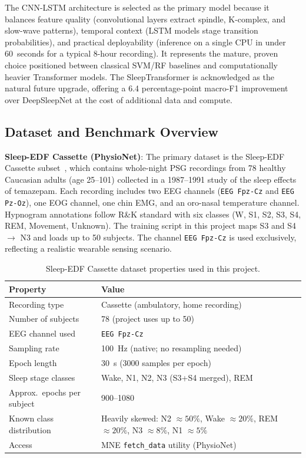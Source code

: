 \documentclass[10pt]{article}
\begin{document}
The CNN-LSTM architecture is selected as the primary model because it balances feature quality (convolutional layers extract spindle, K-complex, and slow-wave patterns), temporal context (LSTM models stage transition probabilities), and practical deployability (inference on a single CPU in under 60~seconds for a typical 8-hour recording). It represents the mature, proven choice positioned between classical SVM/RF baselines and computationally heavier Transformer models. The SleepTransformer is acknowledged as the natural future upgrade, offering a 6.4 percentage-point macro-F1 improvement over DeepSleepNet at the cost of additional data and compute.

\subsection{Dataset and Benchmark Overview}
\label{sec:datasets}

\textbf{Sleep-EDF Cassette (PhysioNet)}: The primary dataset is the Sleep-EDF Cassette subset~\cite{kemp2000analysis,goldberger2000physiobank}, which contains whole-night PSG recordings from 78 healthy Caucasian adults (age 25--101) collected in a 1987--1991 study of the sleep effects of temazepam. Each recording includes two EEG channels (\texttt{EEG Fpz-Cz} and \texttt{EEG Pz-Oz}), one EOG channel, one chin EMG, and an oro-nasal temperature channel. Hypnogram annotations follow R\&K standard with six classes (W, S1, S2, S3, S4, REM, Movement, Unknown). The training script in this project maps S3 and S4 $\rightarrow$ N3 and loads up to 50 subjects. The channel \texttt{EEG Fpz-Cz} is used exclusively, reflecting a realistic wearable sensing scenario.

\begin{table}[h]
\centering
\small
\renewcommand{\arraystretch}{1.2}
\begin{tabular}{|l|l|}
\hline
\textbf{Property} & \textbf{Value} \\\hline
Recording type & Cassette (ambulatory, home recording) \\\hline
Number of subjects & 78 (project uses up to 50) \\\hline
EEG channel used & \texttt{EEG Fpz-Cz} \\\hline
Sampling rate & 100~Hz (native; no resampling needed) \\\hline
Epoch length & 30~s (3000 samples per epoch) \\\hline
Sleep stage classes & Wake, N1, N2, N3 (S3+S4 merged), REM \\\hline
Approx.\ epochs per subject & 900--1080 \\\hline
Known class distribution & Heavily skewed: N2 $\approx 50\%$, Wake $\approx 20\%$, REM $\approx 20\%$, N3 $\approx 8\%$, N1 $\approx 5\%$ \\\hline
Access & MNE \texttt{fetch\_data} utility (PhysioNet) \\\hline
\end{tabular}
\caption{Sleep-EDF Cassette dataset properties used in this project.}
\label{tab:dataset}
\end{table}
\end{document}
